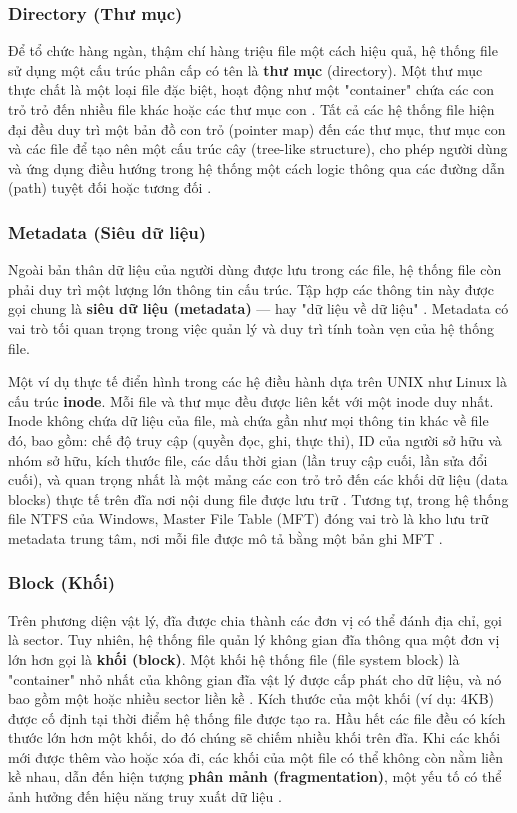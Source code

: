 \documentclass[12pt]{article}
\begin{document}
\subsubsection{Directory (Thư mục)}
Để tổ chức hàng ngàn, thậm chí hàng triệu file một cách hiệu quả, hệ thống file sử dụng một cấu trúc phân cấp có tên là \textbf{thư mục} (directory). Một thư mục thực chất là một loại file đặc biệt, hoạt động như một "container" chứa các con trỏ trỏ đến nhiều file khác hoặc các thư mục con \parencite{EMC2012InformationStorage}. Tất cả các hệ thống file hiện đại đều duy trì một bản đồ con trỏ (pointer map) đến các thư mục, thư mục con và các file để tạo nên một cấu trúc cây (tree-like structure), cho phép người dùng và ứng dụng điều hướng trong hệ thống một cách logic thông qua các đường dẫn (path) tuyệt đối hoặc tương đối \parencite{Tanenbaum2014}.

\subsubsection{Metadata (Siêu dữ liệu)}
Ngoài bản thân dữ liệu của người dùng được lưu trong các file, hệ thống file còn phải duy trì một lượng lớn thông tin cấu trúc. Tập hợp các thông tin này được gọi chung là \textbf{siêu dữ liệu (metadata)} --- hay "dữ liệu về dữ liệu" \parencite{EMC2012InformationStorage}. Metadata có vai trò tối quan trọng trong việc quản lý và duy trì tính toàn vẹn của hệ thống file. 

Một ví dụ thực tế điển hình trong các hệ điều hành dựa trên UNIX như Linux là cấu trúc \textbf{inode}. Mỗi file và thư mục đều được liên kết với một inode duy nhất. Inode không chứa dữ liệu của file, mà chứa gần như mọi thông tin khác về file đó, bao gồm: chế độ truy cập (quyền đọc, ghi, thực thi), ID của người sở hữu và nhóm sở hữu, kích thước file, các dấu thời gian (lần truy cập cuối, lần sửa đổi cuối), và quan trọng nhất là một mảng các con trỏ trỏ đến các khối dữ liệu (data blocks) thực tế trên đĩa nơi nội dung file được lưu trữ \parencite{LinuxJournalInode}. Tương tự, trong hệ thống file NTFS của Windows, Master File Table (MFT) đóng vai trò là kho lưu trữ metadata trung tâm, nơi mỗi file được mô tả bằng một bản ghi MFT \parencite{Silberschatz2018}.

\subsubsection{Block (Khối)}
Trên phương diện vật lý, đĩa được chia thành các đơn vị có thể đánh địa chỉ, gọi là sector. Tuy nhiên, hệ thống file quản lý không gian đĩa thông qua một đơn vị lớn hơn gọi là \textbf{khối (block)}. Một khối hệ thống file (file system block) là "container" nhỏ nhất của không gian đĩa vật lý được cấp phát cho dữ liệu, và nó bao gồm một hoặc nhiều sector liền kề \parencite{EMC2012InformationStorage}. Kích thước của một khối (ví dụ: 4KB) được cố định tại thời điểm hệ thống file được tạo ra. Hầu hết các file đều có kích thước lớn hơn một khối, do đó chúng sẽ chiếm nhiều khối trên đĩa. Khi các khối mới được thêm vào hoặc xóa đi, các khối của một file có thể không còn nằm liền kề nhau, dẫn đến hiện tượng \textbf{phân mảnh (fragmentation)}, một yếu tố có thể ảnh hưởng đến hiệu năng truy xuất dữ liệu \parencite{Tanenbaum2014}.
\end{document}
